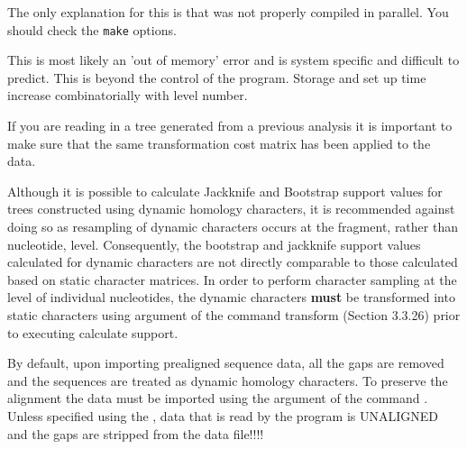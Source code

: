 {The only explanation for this is that \poy was not properly compiled in parallel. You should check the \texttt{make}
options.}

{This is most likely an 'out of memory' error and is system specific and difficult to predict. This is 
beyond the control of the program. Storage and set up time increase combinatorially with level number.} 

{If you are reading in a tree generated from a previous analysis it is important to make sure that the same 
transformation cost matrix has been applied to the data.}

{Although it is possible to calculate Jackknife and Bootstrap support values for trees constructed using dynamic 
homology characters, it is recommended against doing so as resampling of dynamic characters occurs at the fragment, 
rather than nucleotide, level. Consequently, the bootstrap and jackknife support values calculated for dynamic 
characters are not directly comparable to those calculated based on static character matrices. In order to perform 
character sampling at the level of individual nucleotides, the dynamic characters {\bf must} be transformed into 
static characters using  argument of the command transform (Section 3.3.26) prior 
to executing calculate support.}

{By default, upon importing prealigned sequence data, all the gaps are removed and the sequences are 
treated as dynamic homology characters. To preserve the alignment the data must be imported using the
 argument of the command .  Unless specified using the 
, data that is read by the program is UNALIGNED and the gaps are stripped 
from the data file!!!!}

